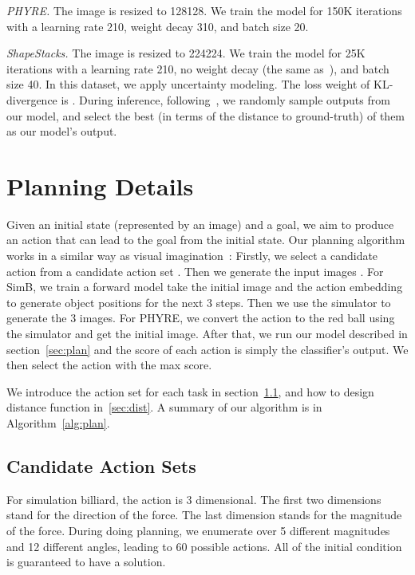 \documentclass{article} \usepackage{iclr2021_conference,times}
\begin{document}
\textit{PHYRE.} The image is resized to 128128. We train the model for 150K iterations with a learning rate 210, weight decay 310, and batch size 20.

\textit{ShapeStacks.} The image is resized to 224224. We train the model for 25K iterations with a learning rate 210, no weight decay (the same as~\cite{ye2019cvp}), and batch size 40. In this dataset, we apply uncertainty modeling. The loss weight of KL-divergence is . During inference, following~\cite{ye2019cvp}, we randomly sample  outputs from our model, and select the best (in terms of the distance to ground-truth) of them as our model's output.

\section{Planning Details}

Given an initial state (represented by an image) and a goal, we aim to produce an action that can lead to the goal from the initial state. Our planning algorithm works in a similar way as visual imagination~\cite{fragkiadaki2015learning}: Firstly, we select a candidate action  from a candidate action set . Then we generate the input images . For SimB, we train a forward model take the initial image and the action embedding to generate object positions for the next 3 steps. Then we use the simulator to generate the 3 images. For PHYRE, we convert the action to the red ball using the simulator and get the initial image. After that, we run our model described in section~\ref{sec:plan} and the score of each action is simply the classifier's output. We then select the action with the max score. 

We introduce the action set for each task in section~\ref{sec:actset}, and how to design distance function in~\ref{sec:dist}. A summary of our algorithm is in Algorithm~\ref{alg:plan}.

\subsection{Candidate Action Sets}
\label{sec:actset}

For simulation billiard, the action is 3 dimensional. The first two dimensions stand for the direction of the force. The last dimension stands for the magnitude of the force. During doing planning, we enumerate over 5 different magnitudes and 12 different angles, leading to 60 possible actions. All of the initial condition is guaranteed to have a solution.
\end{document}
